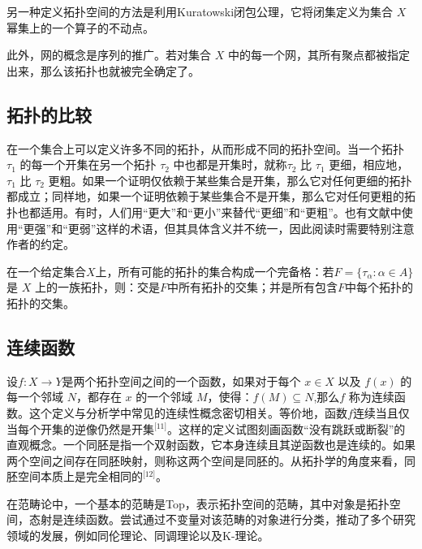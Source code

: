 另一种定义拓扑空间的方法是利用Kuratowski闭包公理，它将闭集定义为集合 $X$ 幂集上的一个算子的不动点。

此外，网的概念是序列的推广。若对集合 $X$ 中的每一个网，其所有聚点都被指定出来，那么该拓扑也就被完全确定了。
\subsection{拓扑的比较}
在一个集合上可以定义许多不同的拓扑，从而形成不同的拓扑空间。当一个拓扑 $\tau_1$ 的每一个开集在另一个拓扑 $\tau_2$ 中也都是开集时，就称$\tau_2$ 比 $\tau_1$ 更细，相应地，$\tau_1$ 比 $\tau_2$ 更粗。如果一个证明仅依赖于某些集合是开集，那么它对任何更细的拓扑都成立；同样地，如果一个证明依赖于某些集合不是开集，那么它对任何更粗的拓扑也都适用。有时，人们用“更大”和“更小”来替代“更细”和“更粗”。也有文献中使用“更强”和“更弱”这样的术语，但其具体含义并不统一，因此阅读时需要特别注意作者的约定。

在一个给定集合$X$上，所有可能的拓扑的集合构成一个完备格：若$F = \{\tau_\alpha : \alpha \in A\}$是 $X$ 上的一族拓扑，则：交是$F$中所有拓扑的交集；并是所有包含$F$中每个拓扑的拓扑的交集。
\subsection{连续函数}
设$f: X \to Y$是两个拓扑空间之间的一个函数，如果对于每个 $x \in X$ 以及 $f(x)$ 的每一个邻域 $N$，都存在 $x$ 的一个邻域 $M$，使得：$f(M) \subseteq N$,那么$f$ 称为连续函数。这个定义与分析学中常见的连续性概念密切相关。等价地，函数$f$连续当且仅当每个开集的逆像仍然是开集\(^\text{[11]}\)。这样的定义试图刻画函数“没有跳跃或断裂”的直观概念。一个同胚是指一个双射函数，它本身连续且其逆函数也是连续的。如果两个空间之间存在同胚映射，则称这两个空间是同胚的。从拓扑学的角度来看，同胚空间本质上是完全相同的\(^\text{[12]}\)。

在范畴论中，一个基本的范畴是Top，表示拓扑空间的范畴，其中对象是拓扑空间，态射是连续函数。尝试通过不变量对该范畴的对象进行分类，推动了多个研究领域的发展，例如同伦理论、同调理论以及K-理论。
